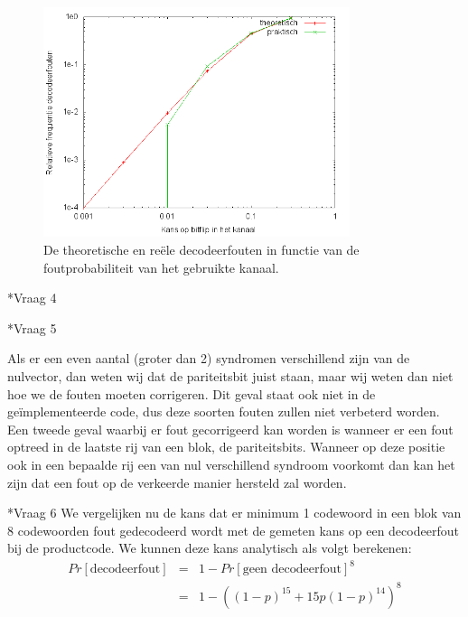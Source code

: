 \documentclass[]{article}
\begin{document}
\begin{section}
\begin{subsection}
        \begin{figure}[h]
            \centering
            \includegraphics[width=0.8\textwidth]{vraag2_3.png}
            \caption{De theoretische en re\"ele decodeerfouten in
                functie van de foutprobabiliteit van het gebruikte
            kanaal.}
            \label{fig:2_3}
        \end{figure}

    \end{subsection}

    \begin{subsection}*{Vraag 4} %
    \end{subsection}

    \begin{subsection}*{Vraag 5} %

        Als er een even aantal (groter dan 2) syndromen verschillend
        zijn van de nulvector, dan weten wij dat de pariteitsbit
        juist staan, maar wij weten dan niet hoe we de fouten moeten
        corrigeren. Dit geval staat ook niet in de ge\"implementeerde
        code, dus deze soorten fouten zullen niet verbeterd worden.
        Een tweede geval waarbij er fout gecorrigeerd kan worden is
        wanneer er een fout optreed in de laatste rij van een blok, de
        pariteitsbits. Wanneer op deze positie ook in een bepaalde rij
        een van nul verschillend syndroom voorkomt dan kan het zijn
        dat een fout op de verkeerde manier hersteld zal worden.

    \end{subsection}

    \begin{subsection}*{Vraag 6} %
        We vergelijken nu de kans dat er minimum 1 codewoord in een
        blok van 8 codewoorden fout gedecodeerd wordt met de gemeten
        kans op een decodeerfout bij de productcode. We kunnen deze
        kans analytisch als volgt berekenen:
        \begin{eqnarray*}
            Pr[\text{decodeerfout}]
                &=& 1 - Pr[\text{geen decodeerfout}]^8 \\ 
                &=& 1 - ((1-p)^{15} + 15p(1-p)^{14})^8
        \end{eqnarray*}


\end{subsection}
\end{section}
\end{document}
